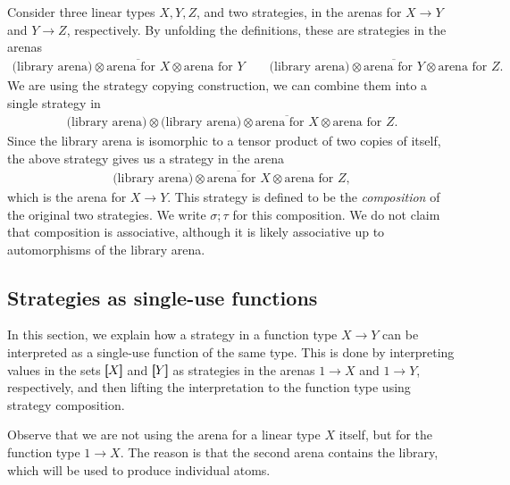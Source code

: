 Consider three linear types $X, Y, Z$, and two strategies, in the arenas for $X \to Y$ and $Y \to Z$, respectively. 
By unfolding the definitions, these are strategies in the arenas 
\begin{align*}
\text{(library arena)} \otimes \overline{\text{arena for $X$}} \otimes \text{arena for $Y$} 
\qquad 
\text{(library arena)} \otimes \overline{\text{arena for $Y$}} \otimes \text{arena for $Z$}.
\end{align*}
We are using the strategy copying construction, we can combine them into a single  strategy in 
\begin{align*}
\text{(library arena)} \otimes  \text{(library arena)}\otimes \overline{\text{arena for $X$}} \otimes \text{arena for $Z$}.
\end{align*}
Since the library arena is isomorphic to a tensor product of two copies of itself, the above strategy gives us a strategy in the arena 
\begin{align*}
    \text{(library arena)} \otimes   \overline{\text{arena for $X$}} \otimes \text{arena for $Z$},
    \end{align*}
which is the arena for $X \to Y$. This strategy is defined to be the \emph{composition} of the original two  strategies. We write $\sigma; \tau$ for this composition. We do not claim that composition is associative, although it is likely associative up to automorphisms of the library arena. 


\subsection{Strategies as single-use functions}
In this section, we explain how a strategy in a function type $X \to Y$ can be interpreted as a single-use function of the same type. This is done by interpreting values in the sets $[\!\![X]\!\!]$ and $[\!\![Y]\!\!]$ as strategies in the arenas $1 \to X$ and $1 \to Y$, respectively, and then lifting the interpretation to the function type using strategy composition. 

Observe that we are not using the arena for a linear type $X$ itself, but for the function type $1 \to X$. The reason is that the second arena contains the library, which will be used to produce individual atoms. 



